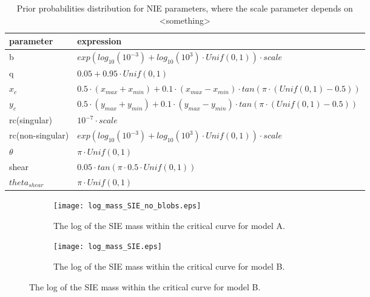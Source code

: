 \documentclass[useAMS,usenatbib]{mn2e}
\begin{document}
\begin{table}
\centering
\begin{tabular}{ l l}
parameter    &  expression        \\  
\hline 
b            &  $exp\left(  log_{10}(10^{-3})+  log_{10}(10^{3})\cdot Unif(0,1) \right)\cdot scale  $ \\
q            &  $0.05 + 0.95\cdot Unif(0,1) $ \\
$x_c$       &  $0.5\cdot (x_{max} + x_{min}) +   0.1 \cdot(x_{max} - x_{min}) \cdot tan(\pi\cdot ( Unif(0,1) - 0.5)  )$ \\
$		y_c$  &  $0.5\cdot (y_{max} + y_{min}) + 0.1\cdot (y_{max} - y_{min}) \cdot tan(\pi\cdot (Unif(0,1)  - 0.5)  ) $\\
rc(singular)   & $10^{-7}\cdot scale$ \\
rc(non-singular)   & $  exp\left(log_{10}(10^{-3})+  log_{10}(10^{3})\cdot Unif(0,1)\right) \cdot scale   $\\
$\theta$   & $\pi \cdot Unif(0,1)$\\
shear      & $0.05 \cdot tan(\pi \cdot 0.5 \cdot Unif(0,1)) $\\
$theta_{shear}$  & $ \pi\cdot Unif(0,1)$ \\
\end{tabular}
\parbox{0.75\linewidth}{\caption{Prior probabilities distribution for NIE parameters, where the scale parameter depends on <something> \label{table:1} }}

\end{table}


 \begin{figure}[!h]
 \hspace{20pt}
\begin{subfigure}{.45\textwidth}
  \centering
  \texttt{[image: log\_mass\_SIE\_no\_blobs.eps]}
\parbox{0.8\linewidth}{\caption{The log of the SIE mass within the critical curve  for model A.  \label{fig:sub1} }}
\end{subfigure}%
\begin{subfigure}{.45\textwidth}
  \centering
  \texttt{[image: log\_mass\_SIE.eps]}
   \parbox{0.8\linewidth}{\caption{The log of the SIE mass within the critical curve for model B.   \label{fig:sub2}}}
\end{subfigure}
   \end{figure}
\end{document}
